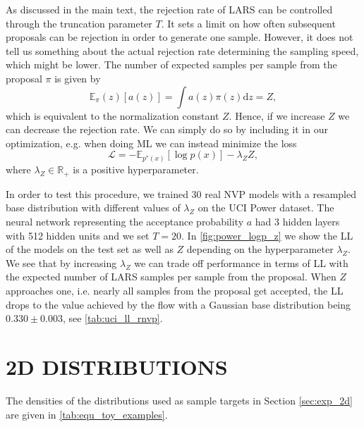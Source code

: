 \documentclass[twoside]{article}
\newcommand{\D}{\mathrm{d}}
\begin{document}
As discussed in the main text, the rejection rate of LARS can be controlled through the truncation parameter $T$. It sets a limit on how often subsequent proposals can be rejection in order to generate one sample. However, it does not tell us something about the actual rejection rate determining the sampling speed, which might be lower. The number of expected samples per sample from the proposal $\pi$ is given by
\begin{equation}
    \mathds{E}_\pi(z)[a(z)] = \int a(z)\pi(z)\D z = Z,
\end{equation}
which is equivalent to the normalization constant $Z$. Hence, if we increase $Z$ we can decrease the rejection rate. We can simply do so by including it in our optimization, e.g. when doing ML we can instead minimize the loss
\begin{equation}
    \mathcal{L} = -\mathds{E}_{p^*(x)}[\log p(x)] - \lambda_Z Z,
    \label{equ:loss_logp_z}
\end{equation}
where $\lambda_Z \in \mathds{R}_+$ is a positive hyperparameter.

In order to test this procedure, we trained 30 real NVP models with a resampled base distribution with different values of $\lambda_Z$ on the UCI Power dataset. The neural network representing the acceptance probability $a$ had 3 hidden layers with 512 hidden units and we set $T=20$. In \autoref{fig:power_logp_z} we show the LL of the models on the test set as well as $Z$ depending on the hyperparameter $\lambda_Z$. We see that by increasing $\lambda_Z$ we can trade off performance in terms of LL with the expected number of LARS samples per sample from the proposal. When $Z$ approaches one, i.e. nearly all samples from the proposal get accepted, the LL drops to the value achieved by the flow with a Gaussian base distribution being $0.330\pm0.003$, see \autoref{tab:uci_ll_rnvp}.


\section{2D DISTRIBUTIONS}

The densities of the distributions used as sample targets in Section \ref{sec:exp_2d} are given in \autoref{tab:equ_toy_examples}.
\end{document}
